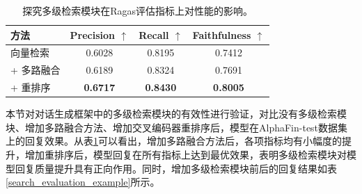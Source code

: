 \begin{table}
	\caption{\label{search_module_evaluation}探究多级检索模块在Ragas评估指标上对性能的影响。}
	\centering{}%
	\small 
	\begin{tabular}{lccc}
		\toprule[2pt]
		方法 & Precision $\uparrow$ & Recall $\uparrow$ & Faithfulness $\uparrow$ \\
		\hline
		向量检索 & 0.6028 & 0.8195 & 0.7412 \\
		+ 多路融合 & 0.6189 & 0.8324 & 0.7691 \\
		+ 重排序 & \textbf{0.6717} & \textbf{0.8430} & \textbf{0.8005} \\
		\bottomrule[2pt]
	\end{tabular}
\end{table}

本节对对话生成框架中的多级检索模块的有效性进行验证，对比没有多级检索模块、增加多路融合方法、增加交叉编码器重排序后，模型在AlphaFin-test数据集上的回复效果。从表\ref{search_module_evaluation}可以看出，增加多路融合方法后，各项指标均有小幅度的提升，增加重排序后，模型回复在所有指标上达到最优效果，表明多级检索模块对模型回复质量提升具有正向作用。同时，增加多级检索模块前后的回复结果如表\ref{search_evaluation_example}所示。

